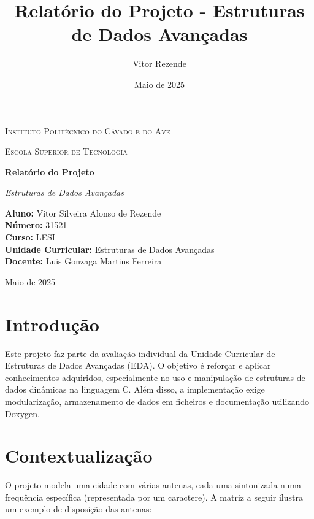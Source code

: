 \documentclass[a4paper,12pt]{article}
\title{Relatório do Projeto - Estruturas de Dados Avançadas}
\author{Vitor Rezende}
\date{Maio de 2025}
\begin{document}
\begin{titlepage}
    \centering

    {\scshape\LARGE Instituto Politécnico do Cávado e do Ave \par}
    \vspace{0.5cm}
    {\scshape\Large Escola Superior de Tecnologia \par}
    \vspace{1.5cm}

    {\Huge\bfseries Relatório do Projeto \par}
    \vspace{0.5cm}
    {\Large\itshape Estruturas de Dados Avançadas\par}
    \vspace{2cm}

    \begin{flushright}
        \textbf{Aluno:} Vitor Silveira Alonso de Rezende \\
        \textbf{Número:} 31521 \\
        \textbf{Curso:} LESI \\
        \textbf{Unidade Curricular:} Estruturas de Dados Avançadas \\
        \textbf{Docente:} Luis Gonzaga Martins Ferreira
    \end{flushright}

    \vfill

    {\large Maio de 2025\par}
\end{titlepage}

\newpage

\tableofcontents
\newpage

\section{Introdução}
Este projeto faz parte da avaliação individual da Unidade Curricular de Estruturas de Dados Avançadas (EDA). O objetivo é reforçar e aplicar conhecimentos adquiridos, especialmente no uso e manipulação de estruturas de dados dinâmicas na linguagem C. Além disso, a implementação exige modularização, armazenamento de dados em ficheiros e documentação utilizando Doxygen.

\newpage

\section{Contextualização}
O projeto modela uma cidade com várias antenas, cada uma sintonizada numa frequência específica (representada por um caractere). A matriz a seguir ilustra um exemplo de disposição das antenas:
\end{document}
